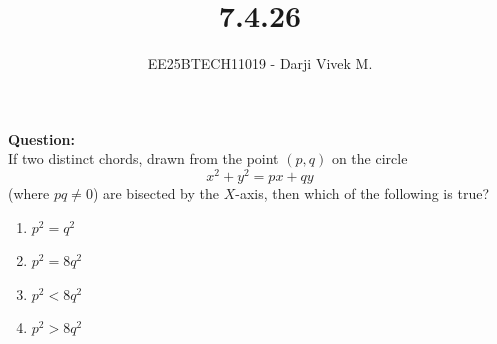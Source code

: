\documentclass[journal]{IEEEtran}
\begin{document}


\title{7.4.26}
\author{EE25BTECH11019 - Darji Vivek M.}
{\let\newpage\relax\maketitle}

\renewcommand{\thefigure}{\theenumi}
\renewcommand{\thetable}{\theenumi}
\setlength{\intextsep}{10pt}
\renewcommand{\thetable}{\theenumi}


\textbf{Question:}\\[2pt]
If two distinct chords, drawn from the point $(p,q)$ on the circle 
\[
x^2 + y^2 = px + qy
\]
(where $pq \ne 0$) are bisected by the $X$-axis, then which of the following is true?
\begin{multicols}{4}
\begin{enumerate}
    \item $p^2 = q^2$
    \item $p^2 = 8q^2$
    \item $p^2 < 8q^2$
    \item $p^2 > 8q^2$
\end{enumerate}
\end{multicols}
\end{document}

